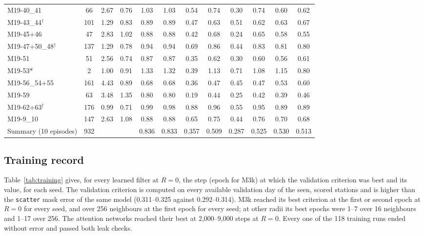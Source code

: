 \documentclass[preprint,12pt,authoryear]{elsarticle}
\begin{document}
\begin{table}[tbp]
{\begin{tabular}{lccccccccccc}
    M19-40\_41 & 66 & 2.67 & 0.76 & 1.03 & 1.03 & 0.54 & 0.74 & 0.30 & 0.74 & 0.60 & 0.62 \\
    M19-43\_44$^\dagger$ & 101 & 1.29 & 0.83 & 0.89 & 0.89 & 0.47 & 0.63 & 0.51 & 0.62 & 0.63 & 0.67 \\
    M19-45+46 & 47 & 2.83 & 1.02 & 0.88 & 0.88 & 0.42 & 0.68 & 0.24 & 0.65 & 0.58 & 0.55 \\
    M19-47+50\_48$^\dagger$ & 137 & 1.29 & 0.78 & 0.94 & 0.94 & 0.69 & 0.86 & 0.44 & 0.83 & 0.81 & 0.80 \\
    M19-51 & 51 & 2.56 & 0.74 & 0.87 & 0.87 & 0.35 & 0.62 & 0.30 & 0.60 & 0.56 & 0.61 \\
    M19-53* & 2 & 1.00 & 0.91 & 1.33 & 1.32 & 0.39 & 1.13 & 0.71 & 1.08 & 1.15 & 0.80 \\
    M19-56\_54+55 & 161 & 4.43 & 0.89 & 0.68 & 0.68 & 0.36 & 0.47 & 0.45 & 0.47 & 0.53 & 0.60 \\
    M19-59 & 63 & 3.48 & 1.35 & 0.80 & 0.80 & 0.19 & 0.44 & 0.25 & 0.42 & 0.39 & 0.46 \\
    M19-62+63$^\dagger$ & 176 & 0.99 & 0.71 & 0.99 & 0.98 & 0.88 & 0.96 & 0.55 & 0.95 & 0.89 & 0.89 \\
    M19-9\_10 & 147 & 2.63 & 1.08 & 0.88 & 0.88 & 0.65 & 0.75 & 0.44 & 0.76 & 0.70 & 0.68 \\
    \midrule
    Summary (10 episodes) & 932 & & & 0.836 & 0.833 & 0.357 & 0.509 & 0.287 & 0.525 & 0.530 & 0.513 \\
    \bottomrule
  \end{tabular}}
\end{table}

\subsection{Training record}
\label{sec:res-training}

Table~\ref{tab:training} gives, for every learned filter at $R = 0$, the step (epoch for M3k) at which the validation criterion was best and its value, for each seed. The validation criterion is computed on every available validation day of the seen, scored stations and is higher than the \texttt{scatter} mask error of the same model (0.311--0.325 against 0.292--0.314). M3k reached its best criterion at the first or second epoch at $R = 0$ for every seed, and over 256 neighbours at the first epoch for every seed; at other radii its best epochs were 1--7 over 16 neighbours and 1--17 over 256. The attention networks reached their best at 2,000--9,000 steps at $R = 0$. Every one of the 118 training runs ended without error and passed both leak checks.
\end{document}
